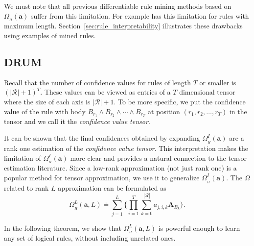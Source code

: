 \documentclass{article}
\newcommand{\mb}[1]{\mathbf{#1}}
\begin{document}
We must note that all previous differentiable rule mining methods based on $\Omega_{\scriptstyle_{H}}(\mb{a})$ suffer from this limitation. For example \citet{yang2017differentiable} has this limitation for rules with maximum length. Section~\ref{sec:rule_interpretability} illustrates these drawbacks using examples of mined rules.

\subsection{DRUM}
\label{sec:DRUM}

Recall that the number of confidence values for rules of length $T$ or smaller is $(|\mathcal{R}|+1)^T$. These values can be viewed as entries of a $T$ dimensional tensor where the size of each axis is $|\mathcal{R}|+1$. To be more specific, we put the confidence value of the rule with body $B_{r_1} \land B_{r_2} \land \cdots \land B_{r_T}$ at position $(r_1, r_2,\dots, r_T )$ in the tensor and we call it the \textit{confidence value tensor}. 

It can be shown that the final confidences obtained by expanding $\Omega^I_{\scriptstyle_{H}}(\mb{a})$ are a rank one estimation of the \textit{confidence value tensor}. This interpretation makes the limitation of $\Omega^I_{\scriptstyle_{H}}(\mb{a})$ more clear and provides a natural connection to the tensor estimation literature. Since a low-rank approximation (not just rank one) is a popular method for tensor approximation, we use it to generalize $\Omega^I_{\scriptstyle_{H}}(\mb{a})$. The $\Omega$ related to rank $L$ approximation can be formulated as
\begin{equation}\label{eq:omega}
    \Omega^L_{\scriptstyle_{H}}(\mb{a}, L) \doteq \sum^{L}_{j=1} \{ \prod_{i=1}^T \sum_{k=0}^{|\mathcal{R}|} a_{j,i,k} \mb{A}_{B_k}\}.
\end{equation}

In the following theorem, we show that $\Omega^L_{\scriptstyle_{H}}(\bm{a}, L)$ is powerful enough to learn any set of logical rules, without including unrelated ones.
\end{document}
